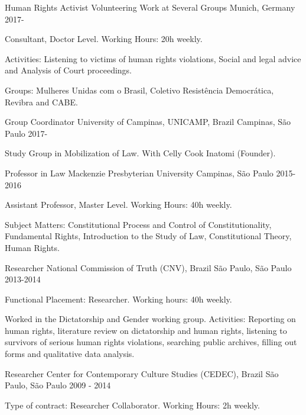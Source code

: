 
\begin{cventries}

\cventry
{Human Rights Activist}
{Volunteering Work at Several Groups}
{Munich, Germany}
{2017-}
{
\begin{cvitems}
  \item Consultant, Doctor Level. Working Hours: 20h weekly.
  \item Activities: Listening to victims of human rights violations, Social and legal advice and Analysis of Court proceedings.
  \item Groups: Mulheres Unidas com o Brasil, Coletivo Resistência Democrática, Revibra and CABE.
\end{cvitems}
}

\cventry
{Group Coordinator}
{University of Campinas, UNICAMP, Brazil}
{Campinas, São Paulo}
{2017-}
{
\begin{cvitems}
  \item Study Group in Mobilization of Law. With Celly Cook Inatomi (Founder).
\end{cvitems}
}

\cventry
{Professor in Law}
{Mackenzie Presbyterian University}
{Campinas, São Paulo}
{2015-2016}
{
\begin{cvitems}
  \item Assistant Professor, Master Level. Working Hours: 40h weekly.
  \item Subject Matters: Constitutional Process and Control of Constitutionality, Fundamental Rights, Introduction to the Study of Law, Constitutional Theory, Human Rights.
\end{cvitems}
}

\cventry
{Researcher}
{National Commission of Truth (CNV), Brazil}
{São Paulo, São Paulo}
{2013-2014}
{
\begin{cvitems}
  \item Functional Placement: Researcher. Working hours: 40h weekly.
  \item Worked in the Dictatorship and Gender working group. Activities: Reporting on human rights, literature review on dictatorship and human rights, listening to survivors of serious human rights violations, searching public archives, filling out forms and qualitative data analysis.
\end{cvitems}
}

\cventry
{Researcher}
{Center for Contemporary Culture Studies (CEDEC), Brazil}
{São Paulo, São Paulo}
{2009 - 2014}
{
\begin{cvitems}
  \item Type of contract: Researcher Collaborator. Working Hours: 2h weekly.
\end{cvitems}
}


\end{cventries}
